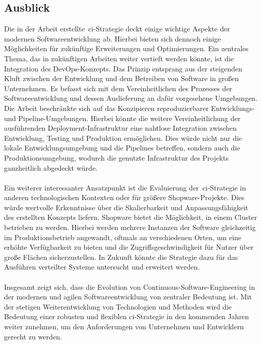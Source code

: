 \subsection{Ausblick} \label{subsec:06-prospect-2}

Die in der Arbeit erstellte\ \acrshort{ci}-Strategie deckt einige wichtige Aspekte der modernen Softwareentwicklung
ab.
Hierbei bieten sich dennoch einige Möglichkeiten für zukünftige Erweiterungen und Optimierungen.
Ein zentrales Thema, das in zukünftigen Arbeiten weiter vertieft werden könnte, ist die Integration des
\glqq DevOps\grqq-Konzepts.
Das Prinzip entsprang aus der steigenden Kluft zwischen der Entwicklung und dem Betreiben von Software in großen
Unternehmen.
Es befasst sich mit dem Vereinheitlichen des Prozesses der Softwareentwicklung und dessen Auslieferung an
dafür vorgesehene Umgebungen.
Die Arbeit beschränkte sich auf das Konzipieren reproduzierbarer Entwicklungs- und Pipeline-Umgebungen.
Hierbei könnte die weitere Vereinheitlichung der ausführenden Deployment-Infrastruktur eine nahtlose Integration
zwischen Entwicklung, Testing und Produktion ermöglichen.
Dies würde nicht nur die lokale Entwicklungsumgebung und die Pipelines betreffen, sondern auch die
Produktionsumgebung, wodurch die genutzte Infrastruktur des Projekts ganzheitlich abgedeckt würde.
\\\\
Ein weiterer interessanter Ansatzpunkt ist die Evaluierung der\ \acrshort{ci}-Strategie in anderen technologischen
Kontexten oder für größere Shopware-Projekte.
Dies würde wertvolle Erkenntnisse über die Skalierbarkeit und Anpassungsfähigkeit des erstellten Konzepts liefern.
Shopware bietet die Möglichkeit, in einem Cluster betrieben zu werden.
Hierbei werden mehrere Instanzen der Software gleichzeitig im Produktionsbetrieb angewandt, oftmals an
verschiedenen Orten, um eine erhöhte Verfügbarkeit zu bieten und die Zugriffsgeschwindigkeit für Nutzer über große
Flächen sicherzustellen.
In Zukunft könnte die Strategie dazu für das Ausführen verteilter Systeme untersucht und erweitert werden.
\\\\
Insgesamt zeigt sich, dass die Evolution von Continuous-Software-Engineering in der modernen und agilen
Softwareentwicklung von zentraler Bedeutung ist.
Mit der stetigen Weiterentwicklung von Technologien und Methoden wird die Bedeutung einer robusten und flexiblen
\acrshort{ci}-Strategie in den kommenden Jahren weiter zunehmen, um den Anforderungen von Unternehmen und Entwicklern
gerecht zu werden.

\clearpage

